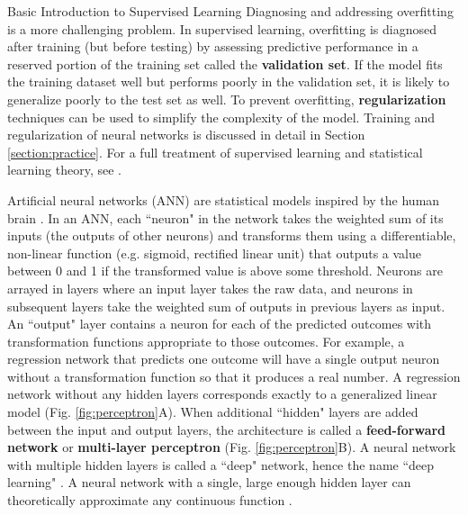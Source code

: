 \begin{TCBBox}[label=Box:supervisedlearning]{Basic Introduction to Supervised Learning}
Diagnosing and addressing overfitting is a more challenging problem. In supervised learning, overfitting is diagnosed after training (but before testing) by assessing predictive performance in a reserved portion of the training set called the \textbf{validation set}. If the model fits the training dataset well but performs poorly in the validation set, it is likely to generalize poorly to the test set as well. To prevent overfitting, \textbf{regularization} techniques can be used to simplify the complexity of the model. Training and regularization of neural networks is discussed in detail in Section \ref{section:practice}. For a full treatment of supervised learning and statistical learning theory, see \citet{hastie2009elements}.
\end{TCBBox}

Artificial neural networks (ANN) are statistical models inspired by the human brain \citep{brand_koch_xu,Goodfellow-et-al-2016}. In an ANN, each ``neuron" in the network takes the weighted sum of its inputs (the outputs of other neurons) and transforms them using a differentiable, non-linear function (e.g. sigmoid, rectified linear unit) that outputs a value between 0 and 1 if the transformed value is above some threshold. Neurons are arrayed in layers where an input layer takes the raw data, and neurons in subsequent layers take the weighted sum of outputs in previous layers as input. An ``output" layer contains a neuron for each of the predicted outcomes with transformation functions appropriate to those outcomes. For example, a regression network that predicts one outcome will have a single output neuron without a transformation function so that it produces a real number. A regression network without any hidden layers corresponds exactly to a generalized linear model (Fig. \ref{fig:perceptron}A). When additional ``hidden" layers are added between the input and output layers, the architecture is called a \textbf{feed-forward network} or \textbf{multi-layer perceptron} (Fig. \ref{fig:perceptron}B). A neural network with multiple hidden layers is called a ``deep" network, hence the name ``deep learning" \citep{lecun2015deep}. A neural network with a single, large enough hidden layer can theoretically approximate any continuous function \citep{Cybenko1989ApproximationBS}. 

